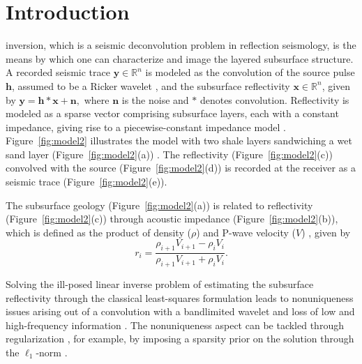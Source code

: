 \documentclass[journal]{IEEEtran}
\newcommand{\rgbsymbol}{\texttt{[image: figures/rgb.png]}}
\begin{document}
\IEEEpeerreviewmaketitle

\section{Introduction}
 inversion, which is a seismic deconvolution problem in reflection seismology, is the means by which one can characterize and image the layered subsurface structure. A recorded seismic trace $\boldsymbol{y} \in \mathbb{R}^{n}$ is modeled as the convolution of the source pulse $\boldsymbol{h}$, assumed to be a Ricker wavelet \cite{shearer2009introduction}, and the subsurface reflectivity $\boldsymbol{x} \in \mathbb{R}^{n}$, given by \( \boldsymbol{y} = \boldsymbol{h}*\boldsymbol{x} + \boldsymbol{n}, \)
where $\boldsymbol{n}$ is the noise and $*$ denotes convolution. Reflectivity is modeled as a sparse vector comprising subsurface layers, each with a constant impedance, giving rise to a piecewise-constant impedance model \cite{oldenburg1983recovery, yilmaz2001seismic}. Figure~\ref{fig:model2} illustrates the model with two shale layers sandwiching a wet sand layer (Figure~\ref{fig:model2}(a)) \cite{russell2019machine}. The reflectivity (Figure~\ref{fig:model2}(c)) convolved with the source (Figure~\ref{fig:model2}(d)) is recorded at the receiver as a seismic trace (Figure~\ref{fig:model2}(e)).

\begin{figure*}[t]
    \centering
    \caption{\protect\rgbsymbol~An ideal three-layer subsurface model. The operator $*$ denotes convolution.}
    \label{fig:model2}
\end{figure*}

The subsurface geology (Figure~\ref{fig:model2}(a)) is related to reflectivity (Figure~\ref{fig:model2}(c)) through acoustic impedance (Figure~\ref{fig:model2}(b)), which is defined as the product of density ($\rho$) and P-wave velocity ($V$) \cite{oldenburg1983recovery}, given by
\begin{equation}\label{rhov}
    r_{i} = \frac{\rho_{i+1}V_{i+1} - \rho_{i}V_{i}}{\rho_{i+1}V_{i+1} + \rho_{i}V_{i}}.
\end{equation}%

Solving the ill-posed linear inverse problem of estimating the subsurface reflectivity through the classical least-squares formulation \cite{taylor1979deconvolution} leads to nonuniqueness issues arising out of a convolution with a bandlimited wavelet and loss of low and high-frequency information \cite{oldenburg1983recovery, berkhout1977least, debeye1990lp}. The nonuniqueness aspect can be tackled through regularization \cite{tarantola2005inverse}, for example, by imposing a sparsity prior on the solution through the $\ell_1$-norm \cite{oldenburg1983recovery, taylor1979deconvolution}.
\end{document}
